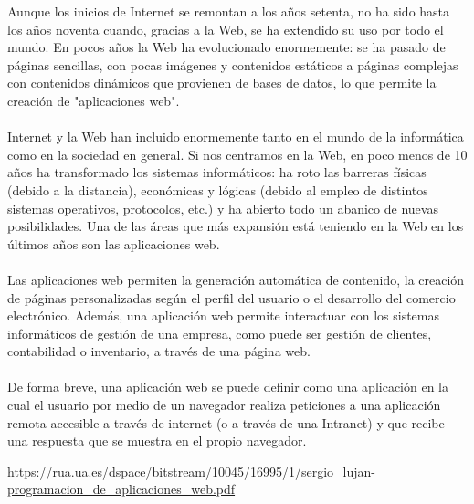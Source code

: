 \cite{sl}Aunque los inicios de Internet se remontan a los años setenta, no ha sido hasta los años noventa cuando, gracias a la Web, se ha extendido su uso por todo el mundo. En pocos años la Web ha evolucionado enormemente: se ha pasado de páginas sencillas, con pocas imágenes y contenidos estáticos a páginas complejas con contenidos dinámicos que provienen de bases de datos, lo que permite la creación de "aplicaciones web".
\\\\
\cite{sl}Internet y la Web han incluido enormemente tanto en el mundo de la informática
como en la sociedad en general. Si nos centramos en la Web, en poco menos de 10
años ha transformado los sistemas informáticos: ha roto las barreras físicas (debido a
la distancia), económicas y lógicas (debido al empleo de distintos sistemas operativos,
protocolos, etc.) y ha abierto todo un abanico de nuevas posibilidades. Una de las áreas
que más expansión está teniendo en la Web en los últimos años son las aplicaciones
web.
\\\\
\cite{sl}Las aplicaciones web permiten la generación automática de contenido, la creación
de páginas personalizadas según el perfil del usuario o el desarrollo del comercio electrónico. Además, una aplicación web permite interactuar con los sistemas informáticos de gestión de una empresa, como puede ser gestión de clientes, contabilidad o
inventario, a través de una página web.
\\\\
\cite{sl}De forma breve, una aplicación web se puede definir como una aplicación en la cual el usuario por medio de un navegador realiza peticiones a una aplicación remota accesible a través de internet (o a través de una Intranet) y que recibe una respuesta que se muestra en el propio navegador.

\begin{remark}
	\url{https://rua.ua.es/dspace/bitstream/10045/16995/1/sergio_lujan-programacion_de_aplicaciones_web.pdf}
\end{remark}


